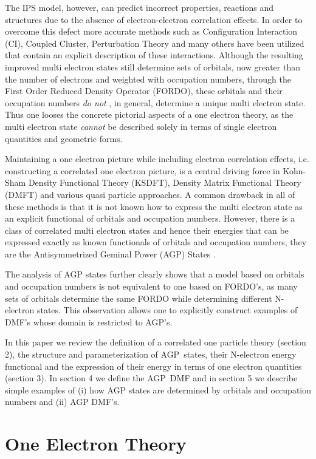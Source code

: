 \documentclass[aps,preprint]{revtex4}%
\begin{document}
The IPS model, however, can predict incorrect properties, reactions and
structures due to the absence of electron-electron correlation effects. In
order to overcome this defect more accurate methods such as Configuration
Interaction (CI), Coupled Cluster, Perturbation Theory and many others have
been utilized that contain an explicit description of these interactions.
Although the resulting improved multi electron states still determine sets of
orbitals, now greater than the number of electrons and weighted with
occupation numbers, through the First Order Reduced Density Operator (FORDO),
these orbitals and their occupation numbers \emph{do not }, in general,
determine a unique multi electron state. Thus one looses the concrete
pictorial aspects of a one electron theory, as the multi electron state
\emph{cannot} be described solely in terms of single electron quantities and
geometric forms.

Maintaining a one electron picture while including electron correlation
effects, i.e. constructing a correlated one electron picture, is a central
driving force in Kohn-Sham Density Functional Theory (KSDFT), Density Matrix
Functional Theory (DMFT) and various quasi particle approaches. A common
drawback in all of these methods is that it is not known how to express the
multi electron state as an explicit functional of orbitals and occupation
numbers. However, there is a class of correlated multi electron states and
hence their energies that can be expressed exactly as known functionals of
orbitals and occupation numbers, they are the Antisymmetrized Geminal Power
(AGP) States \cite{OrtizWeiner2006}.

The analysis of AGP states further clearly shows that a model based on
orbitals and occupation numbers is not equivalent to one based on FORDO's, as
many sets of orbitals determine the same FORDO while determining different
N-electron states. This observation allows one to explicitly construct
examples of DMF's whose domain is restricted to AGP's.

In this paper we review the definition of a correlated one particle theory
(section 2), the structure and parameterization of AGP\ states, their
N-electron energy functional and the expression of their energy in terms of
one electron quantities (section 3). In section 4 we define the AGP\ DMF and
in section 5 we describe simple examples of (i) how AGP states are determined
by orbitals and occupation numbers and (ii) AGP DMF's.

\section{One Electron Theory\label{OET}}
\end{document}
